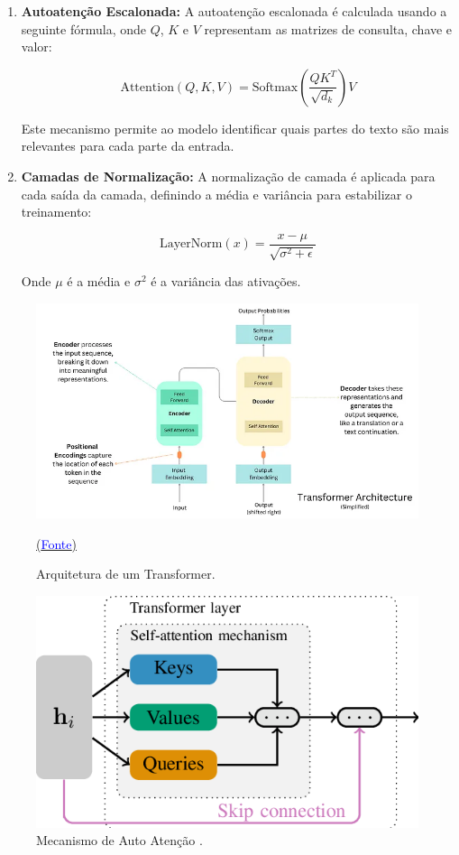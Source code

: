 \begin{enumerate}
    \item \textbf{Autoatenção Escalonada:}  
    A autoatenção escalonada é calculada usando a seguinte fórmula, onde \(Q\), \(K\) e \(V\) representam as matrizes de consulta, chave e valor:

    \[
    \text{Attention}(Q, K, V) = \text{Softmax}\left(\frac{QK^T}{\sqrt{d_k}}\right)V
    \]

    Este mecanismo permite ao modelo identificar quais partes do texto são mais relevantes para cada parte da entrada.

    \item \textbf{Camadas de Normalização:}  
    A normalização de camada é aplicada para cada saída da camada, definindo a média e variância para estabilizar o treinamento:

    \[
    \text{LayerNorm}(x) = \frac{x - \mu}{\sqrt{\sigma^2 + \epsilon}}
    \]

    Onde \(\mu\) é a média e \(\sigma^2\) é a variância das ativações.
\end{enumerate}
\clearpage
  \begin{figure}
    \centering
    \includegraphics[width=0.8\linewidth]{transformer.png}
    \caption{Arquitetura de um Transformer.} \protect\href{https://medium.com/@tech-gumptions/transformer-architecture-simplified-3fb501d461c8}{(\textcolor{blue}{Fonte})}
    \label{fig:cnn}
\end{figure}
  \begin{figure}
    \centering
    \includegraphics[width=0.4\linewidth]{selfattention.png}
    \caption{Mecanismo de Auto Atenção \cite{Vaswani2017}.}
    \label{fig:cnn}
\end{figure}



